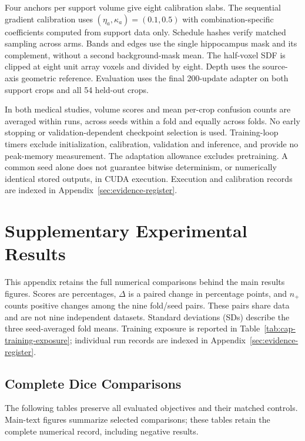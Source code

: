 \documentclass[12pt,a4paper]{article}
\begin{document}
Four anchors per support volume give eight calibration slabs.
The sequential gradient calibration uses
$(\eta_a,\kappa_a)=(0.1,0.5)$ with combination-specific coefficients
computed from support data only. Schedule hashes verify matched
sampling across arms. Bands and edges use the single hippocampus
mask and its complement, without a second background-mask mean.
The half-voxel SDF is clipped at eight unit array voxels and divided
by eight. Depth uses the source-axis geometric reference.
Evaluation uses the final 200-update adapter on both support crops
and all 54 held-out crops.

In both medical studies, volume scores and mean per-crop confusion counts
are averaged within runs, across seeds within a fold and equally across
folds. No early stopping or validation-dependent checkpoint selection is
used. Training-loop timers exclude initialization, calibration, validation
and inference, and provide no peak-memory measurement. The adaptation
allowance excludes pretraining. A common seed alone does not guarantee
bitwise determinism, or numerically identical stored outputs, in CUDA
execution. Execution and calibration records are indexed in
Appendix~\ref{sec:evidence-register}.

\clearpage
\section{Supplementary Experimental Results}
\label{sec:extended-results}

This appendix retains the full numerical comparisons behind the main
results figures. Scores are percentages, $\Delta$ is a paired change in
percentage points, and $n_+$ counts positive changes among the nine
fold/seed pairs. These pairs share data and are not nine independent
datasets. Standard deviations (SDs) describe the three seed-averaged fold
means. Training exposure is reported in
Table~\ref{tab:cap-training-exposure}; individual run records are indexed
in Appendix~\ref{sec:evidence-register}.

\subsection{Complete Dice Comparisons}\label{sec:complete-result-tables}
The following tables preserve all evaluated objectives and their matched
controls. Main-text figures summarize selected comparisons; these tables
retain the complete numerical record, including negative results.
\end{document}
